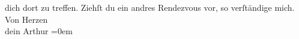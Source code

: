 \begin{ledgroupsized}[t]{13cm}
               dich dort zu treffen.\pend
           \pstart
           Ziehſt du ein andres Rendezvous vor, so verſtändige mich.\pend
           \pstart
           Von Herzen{\\[\baselineskip]}dein \spacefill\mbox{Arthur}\pend
           \leftskip=0em{}
         
         \endnumbering{}\end{ledgroupsized}  \newcommand{\dateiname}{L01427}\newcommand{\titel}{Arthur Schnitzler an Hermann Bahr, 17. 8. 1904}\newcommand{\editorInnen}{ Kurt Ifkovits,  Martin Anton Müller}
      